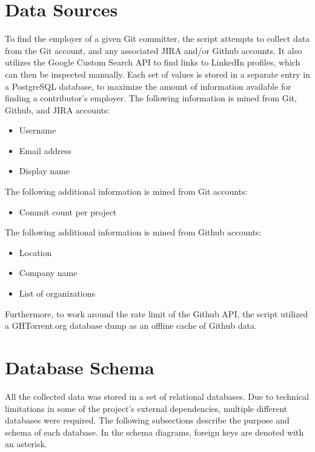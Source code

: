 \section{Data Sources}

To find the employer of a given Git committer, the script attempts to collect data from the Git account, and any associated JIRA and/or Github accounts. It also utilizes the Google Custom Search API to find links to LinkedIn profiles, which can then be inspected manually. Each set of values is stored in a separate entry in a PostgreSQL database, to maximize the amount of information available for finding a contributor's employer.
The following information is mined from Git, Github, and JIRA accounts:
\begin{itemize}
	\item Username
	\item Email address
	\item Display name
\end{itemize}
The following additional information is mined from Git accounts:
\begin{itemize}
	\item Commit count per project
\end{itemize}
The following additional information is mined from Github accounts:
\begin{itemize}
	\item Location
	\item Company name
	\item List of organizations
\end{itemize}
Furthermore, to work around the rate limit of the Github API, the script utilized a GHTorrent.org database dump as an offline cache of Github data.

 

\section{Database Schema}
All the collected data was stored in a set of relational databases. Due to technical limitations in some of the project's external dependencies, multiple different databases were required. The following subsections describe the purpose and schema of each database. In the schema diagrams, foreign keys are denoted with an asterisk.
